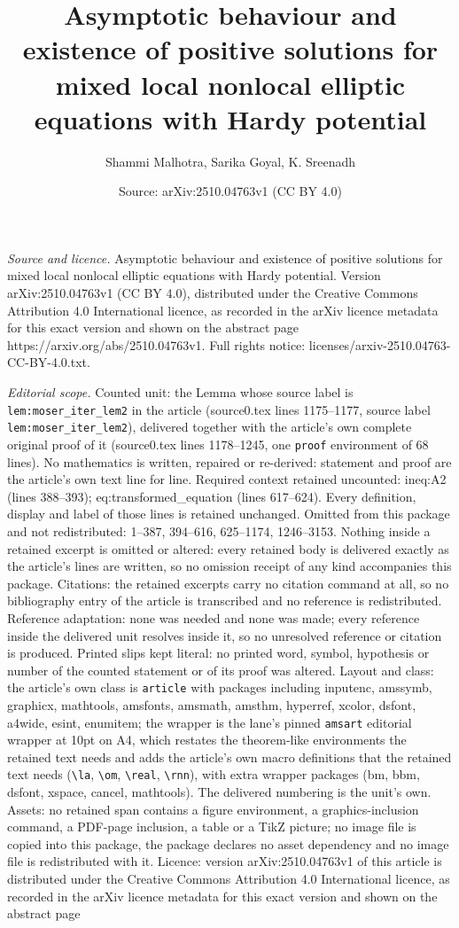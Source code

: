 \documentclass[10pt,a4paper]{amsart}
\title[Asymptotic behaviour and existence of positive solutions for]{Asymptotic behaviour and existence of positive solutions for mixed local nonlocal elliptic equations with Hardy potential}
\author{Shammi Malhotra, Sarika Goyal, K. Sreenadh}
\date{Source: arXiv:2510.04763v1 (CC BY 4.0)}
\begin{document}
\maketitle

\noindent\emph{Source and licence.} Asymptotic behaviour and existence of positive solutions for mixed local nonlocal elliptic equations with Hardy potential. Version arXiv:2510.04763v1 (CC BY 4.0), distributed under the Creative Commons Attribution 4.0 International licence, as recorded in the arXiv licence metadata for this exact version and shown on the abstract page https://arxiv.org/abs/2510.04763v1. Full rights notice: licenses/arxiv-2510.04763-CC-BY-4.0.txt.\par\smallskip

\noindent\textit{Editorial scope.} Counted unit: the Lemma whose source label is \texttt{lem:moser\_iter\_lem2} in the article (source0.tex lines 1175--1177, source label \texttt{lem:moser\_iter\_lem2}), delivered together with the article's own complete original proof of it (source0.tex lines 1178--1245, one \texttt{proof} environment of 68 lines). No mathematics is written, repaired or re-derived: statement and proof are the article's own text line for line. Required context retained uncounted: ineq:A2 (lines 388--393); eq:transformed\_equation (lines 617--624). Every definition, display and label of those lines is retained unchanged. Omitted from this package and not redistributed: 1--387, 394--616, 625--1174, 1246--3153. Nothing inside a retained excerpt is omitted or altered: every retained body is delivered exactly as the article's lines are written, so no omission receipt of any kind accompanies this package. Citations: the retained excerpts carry no citation command at all, so no bibliography entry of the article is transcribed and no reference is redistributed. Reference adaptation: none was needed and none was made; every reference inside the delivered unit resolves inside it, so no unresolved reference or citation is produced. Printed slips kept literal: no printed word, symbol, hypothesis or number of the counted statement or of its proof was altered. Layout and class: the article's own class is \texttt{article} with packages including inputenc, amssymb, graphicx, mathtools, amsfonts, amsmath, amsthm, hyperref, xcolor, dsfont, a4wide, esint, enumitem; the wrapper is the lane's pinned \texttt{amsart} editorial wrapper at 10pt on A4, which restates the theorem-like environments the retained text needs and adds the article's own macro definitions that the retained text needs (\texttt{\textbackslash la}, \texttt{\textbackslash om}, \texttt{\textbackslash real}, \texttt{\textbackslash rnn}), with extra wrapper packages (bm, bbm, dsfont, xspace, cancel, mathtools). The delivered numbering is the unit's own. Assets: no retained span contains a figure environment, a graphics-inclusion command, a PDF-page inclusion, a table or a TikZ picture; no image file is copied into this package, the package declares no asset dependency and no image file is redistributed with it. Licence: version arXiv:2510.04763v1 of this article is distributed under the Creative Commons Attribution 4.0 International licence, as recorded in the arXiv licence metadata for this exact version and shown on the abstract page 
\end{document}

